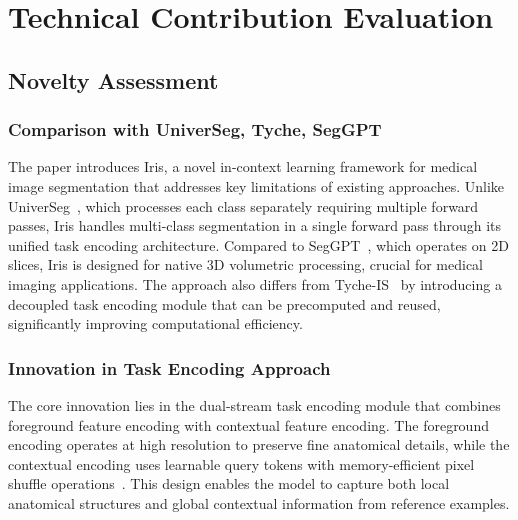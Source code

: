\section*{Technical Contribution Evaluation}
\label{sec:technical_contribution}

\subsection{Novelty Assessment}
\subsubsection{Comparison with UniverSeg, Tyche, SegGPT}
The paper introduces Iris, a novel in-context learning framework for medical image segmentation that addresses key limitations of existing approaches. Unlike UniverSeg~\cite{butoi2023universeg}, which processes each class separately requiring multiple forward passes, Iris handles multi-class segmentation in a single forward pass through its unified task encoding architecture. Compared to SegGPT~\cite{wang2023seggpt}, which operates on 2D slices, Iris is designed for native 3D volumetric processing, crucial for medical imaging applications. The approach also differs from Tyche-IS~\cite{rakic2024tyche} by introducing a decoupled task encoding module that can be precomputed and reused, significantly improving computational efficiency.

\subsubsection{Innovation in Task Encoding Approach}
The core innovation lies in the dual-stream task encoding module that combines foreground feature encoding with contextual feature encoding. The foreground encoding operates at high resolution to preserve fine anatomical details, while the contextual encoding uses learnable query tokens with memory-efficient pixel shuffle operations~\cite{shi2016real}. This design enables the model to capture both local anatomical structures and global contextual information from reference examples.

